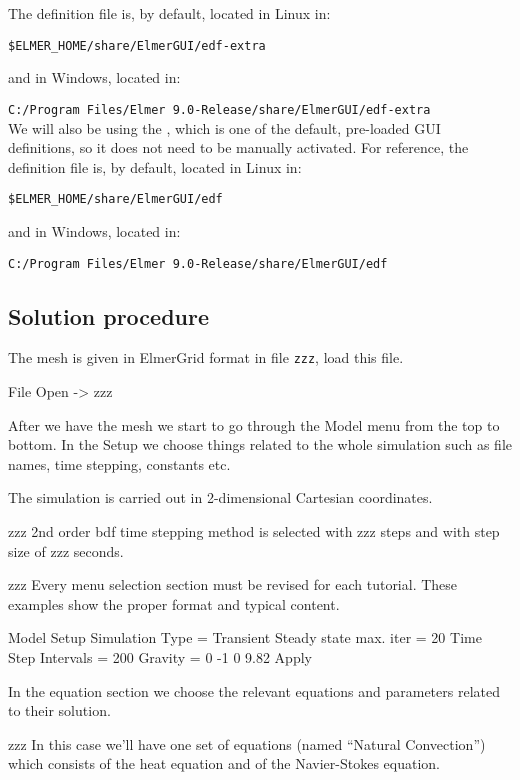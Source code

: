 \noindent The \texttt{} definition file is, by default, located in Linux in:

\texttt{\$ELMER\_HOME/share/ElmerGUI/edf-extra}

\noindent and in Windows, located in:

\texttt{C:/Program Files/Elmer 9.0-Release/share/ElmerGUI/edf-extra}\\

We will also be using the , which is one of the default, pre-loaded GUI definitions, so it does not need to be manually activated.  For reference, the  \texttt{} definition file is, by default, located in Linux in:

\texttt{\$ELMER\_HOME/share/ElmerGUI/edf}

\noindent and in Windows, located in:

\texttt{C:/Program Files/Elmer 9.0-Release/share/ElmerGUI/edf}\\


\subsection*{Solution procedure}

The mesh is given in ElmerGrid format in file \texttt{zzz}, load this file.

\ttbegin
File 
  Open -> zzz
\ttend



After we have the mesh we start to go through the Model menu from the top to bottom.  In the Setup we choose things related to the whole simulation such as file names, time stepping, constants etc.  

The simulation is carried out in 2-dimensional Cartesian coordinates.

zzz 2nd order bdf time stepping method is selected with zzz steps and with step size of zzz seconds.

zzz Every menu selection section must be revised for each tutorial.  These examples show the proper format and typical content.

\ttbegin
Model
  Setup 
    Simulation Type = Transient
    Steady state max. iter = 20
    Time Step Intervals = 200
    Gravity = 0 -1 0 9.82
  Apply
\ttend

In the equation section we choose the relevant equations and parameters related to their solution. 

zzz In this case we'll have one set of equations (named ``Natural Convection'') which consists of the heat equation and of the Navier-Stokes equation.


